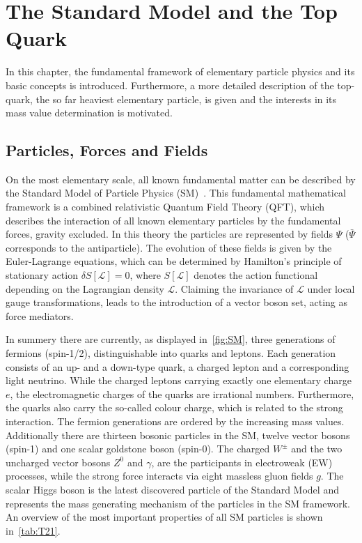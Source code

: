 \chapter{The Standard Model and the Top Quark}
\label{sec:SM1}
In this chapter, the fundamental framework of elementary particle physics and its basic concepts is introduced. Furthermore, a more detailed  description of the top-quark, the so far heaviest elementary particle, is given and the interests in its mass value determination is motivated.  

\section{Particles, Forces and Fields}\label{key:SM 2}


\clearpage


On the most elementary scale, all known fundamental matter can be described by the Standard Model of Particle Physics (SM)~\cite{Glashow:1961tr,Glashow:1970gm,Gross:1973ju,Politzer:1973fx,Politzer:1974fr,Salam:1964ry,Weinberg:1967tq}. This fundamental mathematical framework is a combined relativistic Quantum Field Theory (QFT), which describes the interaction of all known elementary particles by the fundamental forces, gravity excluded.
In this theory the particles are represented by fields $\Psi$ ($\bar{\Psi}$  corresponds to the antiparticle). The evolution of these fields is given by the Euler-Lagrange equations, which can be determined by Hamilton's principle of stationary action $\delta S[\mathscr{L}] \!= 0 $, where $S[\mathscr{L}] $ denotes the action functional depending on the Lagrangian density $\mathscr{L} $. Claiming the invariance of
$\mathscr{L}$ under local gauge transformations, leads to the introduction of a  vector boson set, acting as force mediators.

 In summery there are currently, as displayed in~\cref{fig:SM}, three generations of fermions (spin-1/2), distinguishable into quarks and leptons. Each generation consists of an up- and a down-type quark, a charged lepton and a corresponding light neutrino. While the charged leptons carrying exactly one elementary charge $e$, the electromagnetic charges of the quarks are irrational numbers. Furthermore, the quarks also carry the so-called colour charge, which is related to the strong interaction. The fermion generations are ordered by the increasing mass values.
Additionally there are thirteen bosonic particles in the SM, twelve vector bosons (spin-1) and one scalar goldstone boson (spin-0).
 The charged $W^{\pm}$ and the two uncharged vector bosons $Z^0$ and $ \gamma$, are the participants in electroweak (EW) processes, while the strong force interacts via eight massless gluon fields $g$. The scalar Higgs boson is the latest discovered particle of the Standard Model and represents the mass generating mechanism of the particles in the SM framework. An overview of the most important properties of all SM particles is shown in~\cref{tab:T21}. 
 
